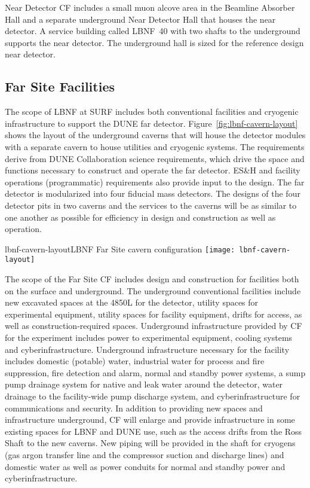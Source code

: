 Near Detector CF includes a small muon alcove area in the Beamline Absorber Hall and a separate underground Near Detector Hall that houses the near detector. A service building called LBNF~40 with two shafts to the underground supports the near detector. The underground hall is sized for the reference design near detector.
 
\subsection{Far Site Facilities}
 
The scope of LBNF at SURF includes both conventional facilities and cryogenic infrastructure to support the DUNE far detector. Figure~\ref{fig:lbnf-cavern-layout} shows the layout of the underground caverns that will house the detector modules with a separate cavern to house utilities and cryogenic systems. The requirements derive from DUNE Collaboration science requirements, which drive the space and functions necessary to construct and operate the far detector.  ES\&H and facility operations (programmatic) requirements also provide input to the design. The far detector is modularized into four  fiducial mass detectors. The designs of the four detector pits in two caverns and the services to the caverns will be as similar to one another as possible for efficiency in design and construction as well as operation. 
 
\begin{cdrfigure}{lbnf-cavern-layout}{LBNF Far Site cavern configuration}  
\texttt{[image: lbnf-cavern-layout]}
\end{cdrfigure}
 
 
The scope of the Far Site CF includes design and construction for facilities both on the surface and underground. The underground conventional facilities include new excavated spaces at the 4850L for the detector, utility spaces for experimental equipment, utility spaces for facility equipment, drifts for access, as well as construction-required spaces. Underground infrastructure provided by CF for the experiment includes power to experimental equipment, cooling systems and cyberinfrastructure. Underground infrastructure necessary for the facility includes domestic (potable) water, industrial water for process and fire suppression, fire detection and alarm, normal and standby power systems, a sump pump drainage system for native and leak water around the detector, water drainage to the facility-wide pump discharge system, and cyberinfrastructure for communications and security.
In addition to providing new spaces and infrastructure underground, CF will enlarge and provide infrastructure in some existing spaces for LBNF and DUNE use, such as the access drifts from the Ross Shaft to the new caverns. New piping will be provided in the shaft for cryogens (gas argon transfer line and the compressor suction and discharge lines) and domestic water as well as power conduits for normal and standby power and cyberinfrastructure. 
 
